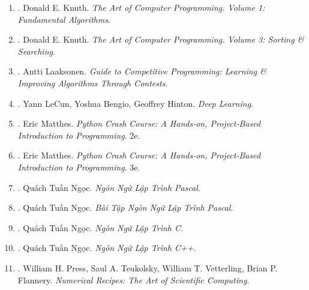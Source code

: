 \documentclass{article}
\begin{document}
\begin{enumerate}
	\item \cite{Knuth1997}. Donald E. Knuth. {\it The Art of Computer Programming. Volume 1: Fundamental Algorithms}.\hfill{\sf[reading]}
	
	\item \cite{Knuth1998}. Donald E. Knuth. {\it The Art of Computer Programming. Volume 3: Sorting \& Searching}.\hfill{\sf[reading]}
	
	\item \cite{Laaksonen2020}. {\sc Antti Laaksonen}. {\it Guide to Competitive Programming: Learning \& Improving Algorithms Through Contests}.\hfill{\sf[reading]}
	
	\item \cite{LeCun_Bengio_Hinton2015}. Yann LeCun, Yoshua Bengio, Geoffrey Hinton. {\it Deep Learning}.\hfill{\sf[reading]}
	
	\item \cite{Matthes2019}. Eric Matthes. {\it Python Crash Course: A Hands-on, Project-Based Introduction to Programming}. 2e.\hfill{\sf[reading]}
	
	\item \cite{Matthes2023}. Eric Matthes. {\it Python Crash Course: A Hands-on, Project-Based Introduction to Programming}. 3e.\hfill{\sf[reading]}
	
	\item \cite{Ngoc_Pascal}. Quách Tuấn Ngọc. {\it Ngôn Ngữ Lập Trình Pascal}.\hfill{\sf[reading]}
	
	\item \cite{Ngoc_BT_Pascal}. Quách Tuấn Ngọc. {\it Bài Tập Ngôn Ngữ Lập Trình Pascal}.\hfill{\sf[reading]}
	
	\item \cite{Ngoc_C}. Quách Tuấn Ngọc. {\it Ngôn Ngữ Lập Trình C}.\hfill{\sf[reading]}
	
	\item \cite{Ngoc_C++}. Quách Tuấn Ngọc. {\it Ngôn Ngữ Lập Trình C++}.\hfill{\sf[done]}
	
	\item \cite{Press_Teukolsky_Vetterling_Flannery_recipe_C++}. {\sc William H. Press, Saul A. Teukolsky, William T. Vetterling, Brian P. Flannery}. {\it Numerical Recipes: The Art of Scientific Computing}. {}
	

\end{enumerate}
\end{document}
